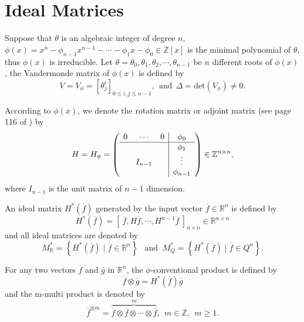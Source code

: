 \documentclass [11pt]{article}
\begin{document}
\section{Ideal Matrices}

Suppose that $\theta$ is an algebraic integer of degree $n$, $ \phi(x)=x^{n}-\phi_{n-1} x^{n-1}-\cdots-\phi_{1} x-\phi_{0} \in \mathbb{Z}[x]$ is the minimal polynomial of $\theta$, thus $\phi(x)$ is irreducible. Let $ \theta=\theta_{0}, \theta_{1}, \theta_{2},\cdots,\theta_{n-1}$ be $n$ different roots of $\phi(x)$, the Vandermonde matrix of $\phi(x)$ is defined by
 \begin{equation}\label{2.1}
 V=V_{\phi}=\left[\theta_{j}^{i}\right]_{0 \leq i, j \leq n-1}, \ \ \text{and}\ \ \Delta=\text{det}( V_{\phi}) \neq 0 .
\end{equation}


According to $\phi(x)$, we denote  the rotation matrix or adjoint matrix (see page 116 of \cite{M}) by
\begin{equation}\label{2.2}
 H=H_{\phi}=
\left(
\begin{array}{ccc|c}
0 & \cdots & 0 & \phi_0\\
\hline
& & & \phi_1\\
& I_{n-1} & & \vdots \\
& & & \phi_{n-1} \\
\end{array}
\right)
\in \mathbb{Z}^{n\times n},
\end{equation}
where $ I_{n-1} $  is the unit matrix of $n-1$ dimension.

\begin{Definition}\label{df2.1}
An  ideal  matrix $H^{*}(\overline{f})$  generated by the input vector $\overline{f} \in \mathbb{R}^{n} $ is defined by
  \begin{equation}\label{2.3}
 H^{*}(\overline{f})=\left[ \ \overline{f}, H\overline{f}, \cdots, H^{n-1}\overline{f} \ \right]_{n \times n} \in \mathbb{R}^{n\times n}
\end{equation}
  and all ideal matrices are  denoted by
\begin{equation}\label{2.4}
M_{\mathbb{R}}^{*}=\left\{H^{*}(\overline{f}) \mid \overline{f} \in \mathbb{R}^{n}\right\}\ \  \text { and } \ M_{Q}^{*}=\left\{H^{*}(\overline{f}) \mid \overline{f} \in Q^{n}\right\}.
\end{equation}
\end{Definition}

\begin{Definition}\label{df2.2}  For any two vectors $\overline{f}$ and $\overline{g}$ in $\mathbb{R}^{n}$, the $\phi$-conventional product is defined by
\begin{equation}\label{2.5}
\overline{f} \otimes \overline{g}=H^{*}(\overline{f} ) \overline{g}
\end{equation}
and   the m-multi product is denoted by
\begin{equation}\label{2.6}
\overline{f}^{\otimes m} =\overbrace{\overline{f} \otimes \overline{f} \otimes \cdots \otimes \overline{f}}^{m},\ \  m \in \mathbb{Z}, \ \ m \geq 1 .
\end{equation}
\end{Definition}
\end{document}
